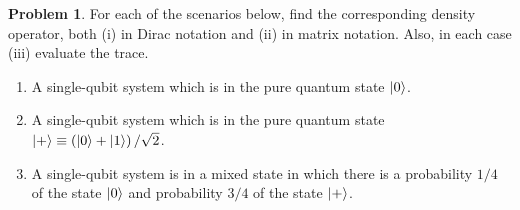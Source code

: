 \documentclass[10pt]{article}
\theoremstyle{definition}
\newtheorem{problem}{Problem}
\begin{document}
\begin{problem}
For each of the scenarios below, find the corresponding density operator, both (i) in
Dirac notation and (ii) in matrix notation. Also, in each case (iii) evaluate the trace.
\begin{enumerate}[label=(\alph*)]
  \item A single-qubit system which is in the pure quantum state $\ket{0}$.
  \item A single-qubit system which is in the pure quantum state $\ket{+}\equiv \left(\ket{0}+\ket{1}\right)/\sqrt{2}$.
  \item A single-qubit system is in a mixed state in which there is a probability $1/4$ of the state
        $\ket{0}$ and probability $3/4$ of the state $\ket{+}$.
\end{enumerate}
\end{problem}
\end{document}

